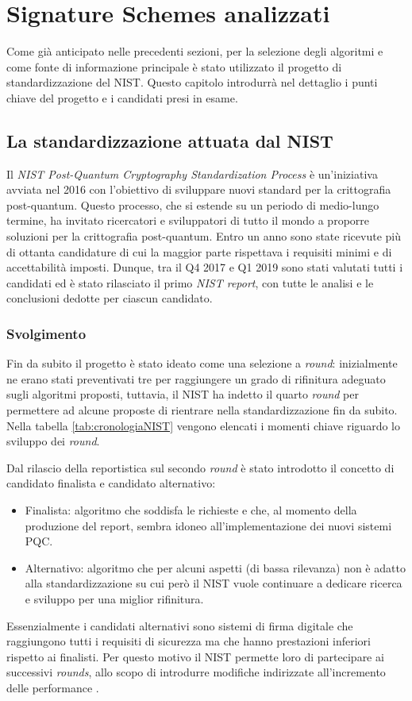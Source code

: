 \chapter{Signature Schemes analizzati}

Come già anticipato nelle precedenti sezioni, per la selezione degli algoritmi e come fonte di informazione principale è stato utilizzato il progetto di standardizzazione del NIST\cite{nist-pqc}. Questo capitolo introdurrà nel dettaglio i punti chiave del progetto e i candidati presi in esame.

\section{La standardizzazione attuata dal NIST}

Il \textit{NIST Post-Quantum Cryptography Standardization Process} \cite{nist-pqc} è un'iniziativa avviata nel 2016 con l'obiettivo di sviluppare nuovi standard per la crittografia post-quantum. Questo processo, che si estende su un periodo di medio-lungo termine, ha invitato ricercatori e sviluppatori di tutto il mondo a proporre soluzioni per la crittografia post-quantum. Entro un anno sono state ricevute più di ottanta candidature di cui la maggior parte rispettava i requisiti minimi e di accettabilità imposti. Dunque, tra il Q4 2017 e Q1 2019 sono stati valutati tutti i candidati ed è stato rilasciato il primo \textit{NIST report}, con tutte le analisi e le conclusioni dedotte per ciascun candidato.

\subsection{Svolgimento}

Fin da subito il progetto è stato ideato come una selezione a \textit{round}: inizialmente ne erano stati preventivati tre per raggiungere un grado di rifinitura adeguato sugli algoritmi proposti, tuttavia, il NIST ha indetto il quarto \textit{round} per permettere ad alcune proposte di rientrare nella standardizzazione fin da subito. Nella tabella \ref{tab:cronologiaNIST} vengono elencati i momenti chiave riguardo lo sviluppo dei \textit{round}.

Dal rilascio della reportistica sul secondo \textit{round} è stato introdotto il concetto di candidato finalista e candidato alternativo:
\begin{itemize}
    \item Finalista: algoritmo che soddisfa le richieste e che, al momento della produzione del report, sembra idoneo all'implementazione dei nuovi sistemi PQC.
    \item Alternativo: algoritmo che per alcuni aspetti (di bassa rilevanza) non è adatto alla standardizzazione su cui però il NIST vuole continuare a dedicare ricerca e sviluppo per una miglior rifinitura.
\end{itemize}
Essenzialmente i candidati alternativi sono sistemi di firma digitale che raggiungono tutti i requisiti di sicurezza ma che hanno prestazioni inferiori rispetto ai finalisti. Per questo motivo il NIST permette loro di partecipare ai successivi \textit{rounds}, allo scopo di introdurre modifiche indirizzate all'incremento delle performance \cite{NISTthirdReport}.

